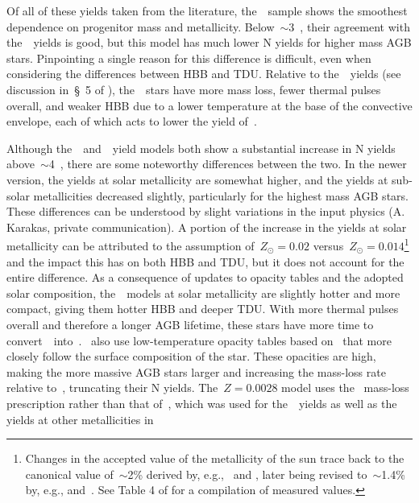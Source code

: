 \documentclass[ms.tex]{subfiles}
\begin{document}
Of all of these yields taken from the literature, the~\cristallo~sample shows
the smoothest dependence on progenitor mass and metallicity.
Below~$\sim$3~\msun, their agreement with the~\karakas~yields is good, but this
model has much lower N yields for higher mass AGB stars.
Pinpointing a single reason for this difference is difficult, even when
considering the differences between HBB and TDU.
Relative to the~\karakas~yields (see discussion in~\S~5 of
\citealp{Karakas2016}), the~\cristallo~stars have more mass loss, fewer
thermal pulses overall, and weaker HBB due to a lower temperature at the base
of the convective envelope, each of which acts to lower the yield of~\Nfourteen.
\par
Although the~\karakasten~and~\karakas~yield models both show a substantial
increase in N yields above~$\sim$4~\msun, there are some noteworthy differences
between the two.
In the newer version, the yields at solar metallicity are somewhat higher,
and the yields at sub-solar metallicities decreased slightly, particularly for
the highest mass AGB stars.
These differences can be understood by slight variations in the input physics
(A. Karakas, private communication).
A portion of the increase in the yields at solar metallicity can be attributed
to the assumption of~$Z_\odot = 0.02$ versus~$Z_\odot = 0.014$\footnote{
	Changes in the accepted value of the metallicity of the sun trace back to
	the canonical value of~$\sim$2\% derived by, e.g.,~\citet{Anders1989} and
	\citet{Grevesse1998}, later being revised to~$\sim$1.4\% by, e.g.,
	\citet{Lodders2003} and~\citet*{Asplund2005}. See Table 4 of
	\citet{Asplund2009} for a compilation of measured values.
} and the impact this has on both HBB and TDU, but it does not account for the
entire difference.
As a consequence of updates to opacity tables and the adopted solar composition,
the~\karakas~models at solar metallicity are slightly hotter and more compact,
giving them hotter HBB and deeper TDU.
With more thermal pulses overall and therefore a longer AGB lifetime, these
stars have more time to convert~\Ctwelve~into~\Nfourteen.
\karakas~also use low-temperature opacity tables based on~\citet{Marigo2002}
that more closely follow the surface composition of the star.
These opacities are high, making the more massive AGB stars larger and
increasing the mass-loss rate relative to~\karakasten, truncating their N
yields.
The~$Z = 0.0028$ model uses the~\citet{Bloecker1995} mass-loss prescription
rather than that of~\citet{Vassiliadis1993}, which was used for
the~\karakasten~yields as well as the yields at other metallicities in
\end{document}
